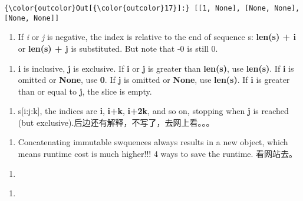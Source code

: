 \documentclass[11pt]{article}
\providecommand{\tightlist}{%
      \setlength{\itemsep}{0pt}\setlength{\parskip}{0pt}}
\begin{document}
\begin{Verbatim}[commandchars=\\\{\}]
{\color{outcolor}Out[{\color{outcolor}17}]:} [[1, None], [None, None], [None, None]]
\end{Verbatim}
            
    \begin{enumerate}
\def\labelenumi{\arabic{enumi}.}
\setcounter{enumi}{2}
\tightlist
\item
  If \emph{i} or \emph{j} is negative, the index is relative to the end
  of sequence s: \textbf{len(s) + i} or \textbf{len(s) + j} is
  substituted. But note that -0 is still 0.
\end{enumerate}

    \begin{enumerate}
\def\labelenumi{\arabic{enumi}.}
\setcounter{enumi}{3}
\tightlist
\item
  \textbf{i} is inclusive, \textbf{j} is exclusive. If \textbf{i} or
  \textbf{j} is greater than \textbf{len(s)}, use \textbf{len(s)}. If
  \textbf{i} is omitted or \textbf{None}, use \textbf{0}. If \textbf{j}
  is omitted or \textbf{None}, use \textbf{len(s)}. If \textbf{i} is
  greater than or equal to \textbf{j}, the slice is empty.
\end{enumerate}

    \begin{enumerate}
\def\labelenumi{\arabic{enumi}.}
\setcounter{enumi}{4}
\tightlist
\item
  s{[}i:j:k{]}, the indices are \textbf{i}, \textbf{i+k}, \textbf{i+2k},
  and so on, stopping when \textbf{j} is reached (but
  exclusive).后边还有解释，不写了，去网上看。。。
\end{enumerate}

    \begin{enumerate}
\def\labelenumi{\arabic{enumi}.}
\setcounter{enumi}{5}
\tightlist
\item
  Concatenating immutable swquences always results in a new object,
  which means runtime cost is much higher!!! 4 ways to save the runtime.
  看网站去。
\end{enumerate}

    \begin{enumerate}
\def\labelenumi{\arabic{enumi}.}
\setcounter{enumi}{6}
\item
\end{enumerate}

    \begin{enumerate}
\def\labelenumi{\arabic{enumi}.}
\setcounter{enumi}{7}
\item
\end{enumerate}
\end{document}
